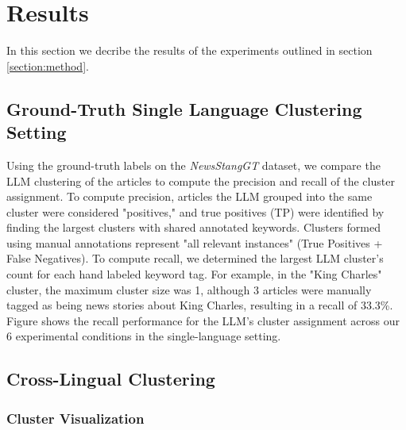 \section{Results}\label{section:results}

In this section we decribe the results of the experiments outlined in section \ref{section:method}.

\subsection{Ground-Truth Single Language Clustering Setting}


Using the ground-truth labels on the \emph{NewsStangGT} dataset, we compare the LLM clustering of the articles to compute the precision and recall of the cluster assignment. 
To compute precision, articles the LLM grouped into the same cluster were considered "positives," and true positives (TP) were identified by finding the largest clusters with shared annotated keywords. 
Clusters formed using manual annotations represent "all relevant instances" (True Positives + False Negatives). 
To compute recall, we determined the largest LLM cluster's count for each hand labeled keyword tag. 
For example, in the "King Charles" cluster, the maximum cluster size was 1, although 3 articles were manually tagged as being news stories about King Charles, resulting in a recall of 33.3\%. 
Figure  shows the recall performance for the LLM's cluster assignment across our 6 experimental conditions in the single-language setting. 





\subsection{Cross-Lingual Clustering}

\subsubsection{Cluster Visualization}


